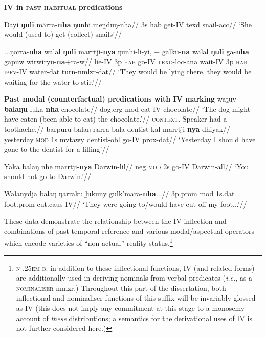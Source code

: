 \pex\textbf{\gls{IV} in \textsc{past habitual} predications}\par\nobreak
\a{}\begingl\gla Ŋayi \textbf{ŋuli} märra-\textbf{nha} ŋunhi meṉḏuŋ-nha//
\glb 3s \gls{hab} get-\gls{IV} \gls{texd} snail-\gls{acc}//
\glft`She would (used to) get (collect) snails'//\endgl

\a\begingl\gla ...ŋorra-\textbf{nha} walal \textbf{ŋuli} marrtji-\textbf{nya} ŋunhi-li-yi, + galku-\textbf{na} walal \textbf{ŋuli} ga-\textbf{nha} gapuw wirwiryu-\textbf{na}+ra-w//
\glb lie-\gls{IV} 3p \textsc{hab} go-\gls{IV} \textsc{texd}-\gls{loc}-\gls{ana} wait-\gls{IV} 3p \textsc{hab} \textsc{ipfv}-\gls{IV} water-\gls{dat} turn-\gls{nmlzr}-\gls{dat}//
\glft`They would be lying there, they would be waiting for the water to stir.'//\endgl
\xe

\pex\textbf{Past modal (counterfactual) predications with \gls{IV} marking}
\a\begingl\gla waṯuy \textbf{balaŋu} ḻuka-\textbf{nha} chocolate//
\glb dog.\gls{erg} \gls{mod} eat-\gls{IV} chocolate//
\glft`The dog might have eaten (been able to eat) the chocolate.'\trailingcitation{[DhG~20190413]}//\endgl
\a\begingl\glpreamble{}\textsc{context.} Speaker had a toothache.//
\gla barpuru balaŋ ŋarra bala dentist-kal marrtji-\textbf{nya} dhiyak//
\glb yesterday \textsc{mod} 1s \gls{mvtawy} dentist-\gls{obl} go-\gls{IV} \gls{prox}-\gls{dat}//
\glft`Yesterday I should have gone to the dentist for a filling'//\endgl

\a\begingl\gla Yaka balaŋ nhe marrtji-\textbf{nya} Darwin-lil//
\glb \gls{neg} \textsc{mod} 2s go-\gls{IV} Darwin-\gls{all}//
\glft`You should not go to Darwin.'//\endgl


\a\begingl\gla Walanydja balaŋ ŋarraku ḻukuny gulk'mara-\textbf{nha}...//
\glb 3p.\gls{prom} \gls{mod} 1s.\gls{dat} foot.\gls{prom} cut.\gls{caus}-\gls{IV}//
\glft `They were going to/would have cut off my foot...'\trailingcitation{[AW~20190422]}//
\endgl\xe


These data demonstrate the relationship between the \gls{IV} inflection and combinations of past temporal reference and various modal/aspectual operators which encode varieties of ``non-actual'' reality status.\footnote{\textsc{n\kern-.25em b}: in addition to these inflectional functions, \gls{IV} (and related forms) are additionally used in deriving nominals from verbal predicates (\textit{i.e.}, as a \textsc{nominaliser} \gls{nmlzr}.) Throughout this part of the dissertation, both inflectional and nominaliser functions of this suffix will be invariably glossed as \gls{IV} (this does not imply any commitment at this stage to a monosemy account of \textit{these} distributions; a semantics for the derivational uses of \gls{IV} is not further considered here.)}

